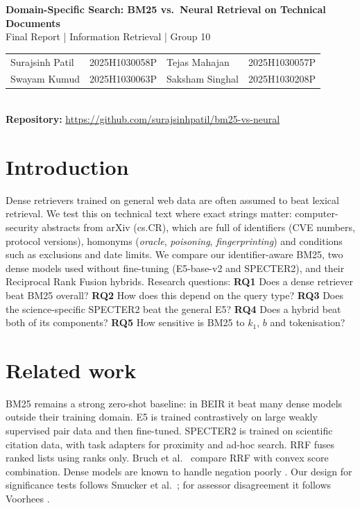 \documentclass[10pt,a4paper]{article}
\newcommand{\repourl}{\url{https://github.com/surajsinhpatil/bm25-vs-neural}}
\begin{document}
\begin{center}
{\Large\bfseries Domain-Specific Search: BM25 vs.\ Neural Retrieval on Technical Documents}\\[3pt]
{\large Final Report \;|\; Information Retrieval \;|\; Group 10}\\[4pt]
\begin{tabular}{llll}
Surajsinh Patil & 2025H1030058P & Tejas Mahajan & 2025H1030057P\\
Swayam Kumud & 2025H1030063P & Saksham Singhal & 2025H1030208P
\end{tabular}\\[3pt]
\textbf{Repository:} \repourl\\[6pt]
\end{center}

\section{Introduction}
Dense retrievers trained on general web data are often assumed to beat lexical retrieval. We test
this on technical text where exact strings matter: computer-security abstracts from arXiv (cs.CR),
which are full of identifiers (CVE numbers, protocol versions), homonyms (\emph{oracle},
\emph{poisoning}, \emph{fingerprinting}) and conditions such as exclusions and date limits.
We compare our identifier-aware BM25, two dense models used without fine-tuning (E5-base-v2 and
SPECTER2), and their Reciprocal Rank Fusion hybrids. Research questions:
\textbf{RQ1} Does a dense retriever beat BM25 overall?
\textbf{RQ2} How does this depend on the query type?
\textbf{RQ3} Does the science-specific SPECTER2 beat the general E5?
\textbf{RQ4} Does a hybrid beat both of its components?
\textbf{RQ5} How sensitive is BM25 to $k_1$, $b$ and tokenisation?

\section{Related work}
BM25 \cite{robertson} remains a strong zero-shot baseline: in BEIR \cite{beir} it beat many dense
models outside their training domain. E5 \cite{e5} is trained contrastively on large weakly
supervised pair data and then fine-tuned. SPECTER2 \cite{specter2} is trained on scientific
citation data, with task adapters for proximity and ad-hoc search. RRF \cite{rrf} fuses ranked
lists using ranks only. Bruch et al.\ \cite{bruch} compare RRF with convex score combination.
Dense models are known to handle negation poorly \cite{nevir}. Our design for significance tests
follows Smucker et al.\ \cite{smucker}; for assessor disagreement it follows Voorhees \cite{voorhees}.
\end{document}
